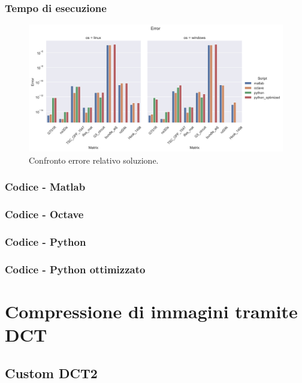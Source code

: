 \documentclass{beamer}
\begin{document}
\begin{frame}
	\frametitle{Tempo di esecuzione}
	\begin{figure}
		\includegraphics[width=1.35\textheight]{assets/error.jpg}
		\caption{Confronto errore relativo soluzione.}
		\label{fig:error}
	\end{figure}
\end{frame}

\begin{frame}
	\frametitle{Codice - Matlab}
	
\end{frame}


\begin{frame}
	\frametitle{Codice - Octave}
	
\end{frame}


\begin{frame}
	\frametitle{Codice - Python}
	
\end{frame}


\begin{frame}
	\frametitle{Codice - Python ottimizzato}
	
\end{frame}

\section{Compressione di immagini tramite DCT}

\subsection{Custom DCT2}
\end{document}
